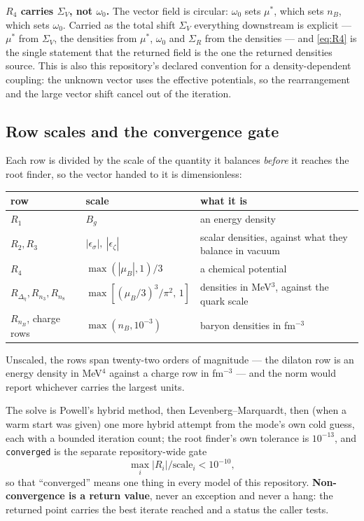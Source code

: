 \documentclass[11pt,a4paper]{article}
\newcommand{\mustar}{\mu^{*}}
\newcommand{\code}[1]{\texttt{#1}}
\begin{document}
\textbf{$R_4$ carries $\Sigma_V$, not $\omega_0$.} The vector field is
circular: $\omega_0$ sets $\mustar$, which sets $n_B$, which sets $\omega_0$.
Carried as the total shift $\Sigma_V$ everything downstream is explicit ---
$\mustar$ from $\Sigma_V$, the densities from $\mustar$, $\omega_0$ and
$\Sigma_R$ from the densities --- and \eqref{eq:R4} is the single statement
that the returned field is the one the returned densities source. This is also
this repository's declared convention for a density-dependent coupling: the
unknown vector uses the effective potentials, so the rearrangement and the
large vector shift cancel out of the iteration.

\subsection{Row scales and the convergence gate}
\label{sec:scales}

Each row is divided by the scale of the quantity it balances \emph{before} it
reaches the root finder, so the vector handed to it is dimensionless:

\begin{center}
\begin{tabular}{lll}
\toprule
row & scale & what it is \\
\midrule
$R_1$ & $B_g$ & an energy density \\
$R_2,R_3$ & $|\epsilon_\sigma|,\ |\epsilon_\zeta|$
 & scalar densities, against what they balance in vacuum \\
$R_4$ & $\max(|\mu_B|,1)/3$ & a chemical potential \\
$R_{\Delta_\eta},R_{n_3},R_{n_8}$ & $\max\!\left[(\mu_B/3)^3/\pi^2,\,1\right]$
 & densities in MeV$^3$, against the quark scale \\
$R_{n_B}$, charge rows & $\max(n_B,10^{-3})$ & baryon densities in fm$^{-3}$ \\
\bottomrule
\end{tabular}
\end{center}

Unscaled, the rows span twenty-two orders of magnitude --- the dilaton row is
an energy density in MeV$^4$ against a charge row in fm$^{-3}$ --- and the
norm would report whichever carries the largest units.

The solve is Powell's hybrid method, then Levenberg--Marquardt, then (when a
warm start was given) one more hybrid attempt from the mode's own cold guess,
each with a bounded iteration count; the root finder's own tolerance is
$10^{-13}$, and \code{converged} is the separate repository-wide gate
\begin{equation}
\max_i \left|R_i\right|/\text{scale}_i < 10^{-10},
\end{equation}
so that ``converged'' means one thing in every model of this repository.
\textbf{Non-convergence is a return value}, never an exception and never a
hang: the returned point carries the best iterate reached and a status the
caller tests.
\end{document}
